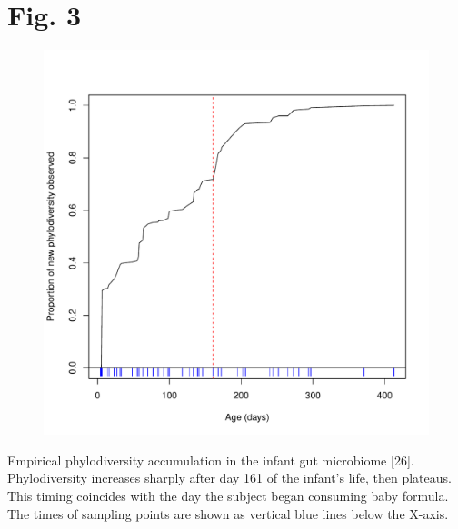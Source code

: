\documentclass{article}
\begin{document}
\section*{Fig. 3}
\begin{figure}[ht]
	\centering
	\includegraphics[scale=0.80]{../Fig_3.pdf}
\end{figure}
Empirical phylodiversity accumulation in the infant gut microbiome [26]. Phylodiversity increases sharply after day 161 of the infant’s life, then plateaus. This timing coincides with the day the subject began consuming baby formula. The times of sampling points are shown as vertical blue lines below the X-axis.
%
\newpage
%
%
\end{document}
